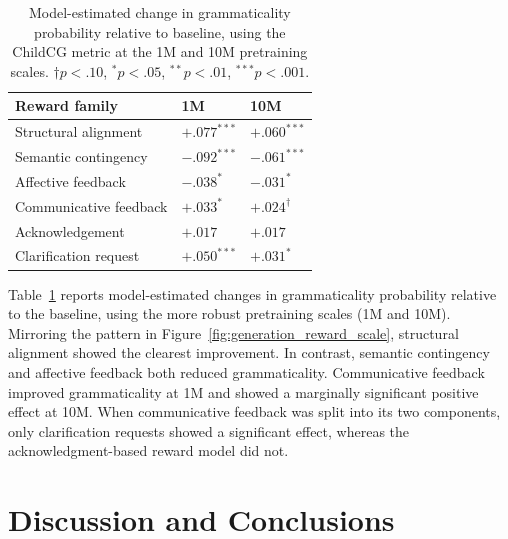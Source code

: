 \begin{table}[t]
\centering
\small
\begin{tabular}{lll}
\toprule
Reward family & 1M & 10M \\
\midrule
Structural alignment      & $+.077^{***}$ & $+.060^{***}$ \\
Semantic contingency      & $-.092^{***}$ & $-.061^{***}$ \\
Affective feedback        & $-.038^{*}$   & $-.031^{*}$   \\
Communicative feedback    & $+.033^{*}$   & $+.024^{\dagger}$ \\
\quad Acknowledgement     & $+.017$       & $+.017$       \\
\quad Clarification request  & $+.050^{***}$ & $+.031^{*}$   \\
\bottomrule
\end{tabular}
\caption{
Model-estimated change in grammaticality probability relative to baseline, using the ChildCG metric at the 1M and 10M pretraining scales.
$\dagger p<.10$, $^{*}p<.05$, $^{**}p<.01$, $^{***}p<.001$.
}
\label{tab:grammar_reward_effects}
\end{table}

Table~\ref{tab:grammar_reward_effects} reports model-estimated changes in grammaticality probability relative to the baseline, using the more robust pretraining scales (1M and 10M). Mirroring the pattern in Figure~\ref{fig:generation_reward_scale}, structural alignment showed the clearest improvement. In contrast, semantic contingency and affective feedback both reduced grammaticality. Communicative feedback improved grammaticality at 1M and showed a marginally significant positive effect at 10M. When communicative feedback was split into its two components, only clarification requests showed a significant effect, whereas the acknowledgment-based reward model did not.



\section{Discussion and Conclusions}

